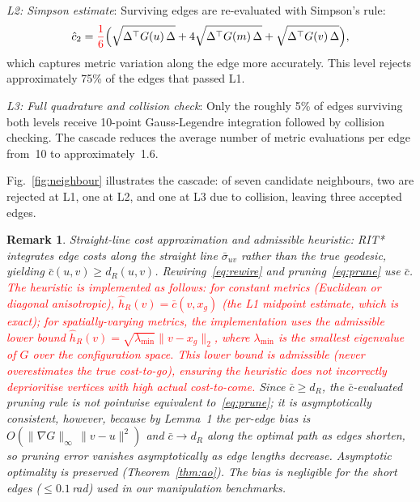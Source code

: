 \documentclass[journal]{IEEEtran}
\newcommand{\rev}[1]{#1}%
\newcommand{\greenrev}[1]{#1}%
\newcommand{\redrev}[1]{\textcolor{red}{#1}}%
\newtheorem{remark}{Remark}
\newcommand{\dR}{d_{\!R}}
\begin{document}
\textit{L2: Simpson estimate}:
Surviving edges are re-evaluated with Simpson's rule:
\begin{equation}\label{eq:simpson}
  \hat{c}_2 = \redrev{\frac{1}{6}}\Bigl(
    \sqrt{\Delta^\top G(u)\,\Delta}
    + 4\sqrt{\Delta^\top G(m)\,\Delta}
    + \sqrt{\Delta^\top G(v)\,\Delta}\Bigr),
\end{equation}
which captures metric variation along the edge more accurately.
This level rejects approximately 75\% of the edges that passed L1.

\textit{L3: Full quadrature and collision check}:
Only the roughly 5\% of edges surviving both levels receive 10-point
Gauss-Legendre integration followed by collision checking. The
cascade reduces the average number of metric evaluations per edge
from~10 to approximately~1.6.

Fig.~\ref{fig:neighbour} illustrates the cascade: of seven candidate
neighbours, two are rejected at L1, one at L2, and one at L3 due to
collision, leaving three accepted edges.


\begin{remark}Straight-line cost approximation and admissible heuristic: \label{rem:slc}
RIT* integrates edge costs along the straight line $\bar{\sigma}_{uv}$ rather than the true geodesic, yielding $\bar{c}(u,v)\ge\dR(u,v)$. Rewiring~\eqref{eq:rewire} and pruning~\eqref{eq:prune} use $\bar{c}$.
\redrev{The heuristic is implemented as follows: for constant metrics (Euclidean or diagonal anisotropic), $\hat{h}_R(v)=\bar{c}(v,x_g)$ (the L1 midpoint estimate, which is exact); for spatially-varying metrics, the implementation uses the admissible lower bound $\hat{h}_R(v)=\sqrt{\lambda_{\min}}\|v-x_g\|_2$, where $\lambda_{\min}$ is the smallest eigenvalue of $G$ over the configuration space. This lower bound is admissible (never overestimates the true cost-to-go), ensuring the heuristic does not incorrectly deprioritise vertices with high actual cost-to-come.}
Since $\bar c \ge \dR$, the $\bar c$-evaluated pruning rule is not pointwise equivalent to~\eqref{eq:prune}; it is asymptotically consistent, however, because by \greenrev{Lemma~1} the per-edge bias is $O(\|\nabla G\|_\infty\,\|v-u\|^2)$ and $\bar c \to \dR$ along the optimal path as edges shorten, \rev{so pruning error vanishes asymptotically as edge lengths decrease.} Asymptotic optimality is preserved (Theorem~\ref{thm:ao}).
The bias is negligible for the short edges ($\le 0.1$\,rad) used in our manipulation benchmarks.
\end{remark}
\end{document}
